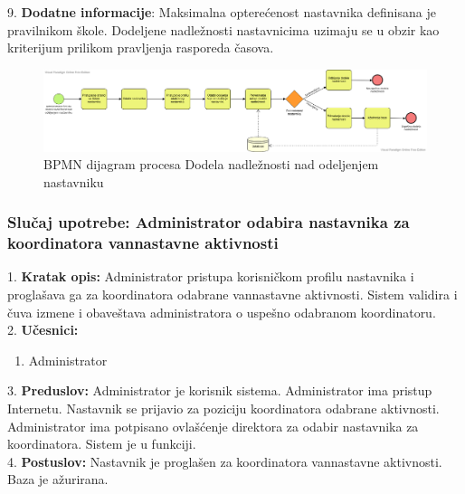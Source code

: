\documentclass{article}
\begin{document}
9. \textbf{Dodatne informacije}: Maksimalna opterećenost nastavnika definisana je pravilnikom škole. Dodeljene nadležnosti nastavnicima uzimaju se u obzir kao kriterijum prilikom pravljenja rasporeda časova. \\

\begin{landscape}
\begin{figure} [!ht]
    \begin{center}
        \includegraphics[scale=0.4]{imgs/BPMN_dodela_nadleznosti.png}
    \end{center}
\caption{BPMN dijagram procesa Dodela nadležnosti nad odeljenjem nastavniku}
\end{figure}
\end{landscape}

\subsubsection{Slučaj upotrebe: Administrator odabira nastavnika za koordinatora vannastavne aktivnosti}
1. \textbf{Kratak opis:} Administrator pristupa korisničkom profilu nastavnika i proglašava ga za koordinatora odabrane vannastavne aktivnosti. Sistem validira i čuva izmene i obaveštava administratora o uspešno odabranom koordinatoru. \\

2. \textbf{Učesnici:}
\begin{enumerate} [label=(\alph*)]
\item Administrator
\end{enumerate} 

3. \textbf{Preduslov:} Administrator je korisnik sistema. Administrator ima pristup Internetu. Nastavnik se prijavio za poziciju koordinatora odabrane aktivnosti. Administrator ima potpisano ovlašćenje direktora za odabir nastavnika za koordinatora. Sistem je u funkciji. \\

4. \textbf{Postuslov:} Nastavnik je proglašen za koordinatora vannastavne aktivnosti. Baza je ažurirana. \\
\end{document}
